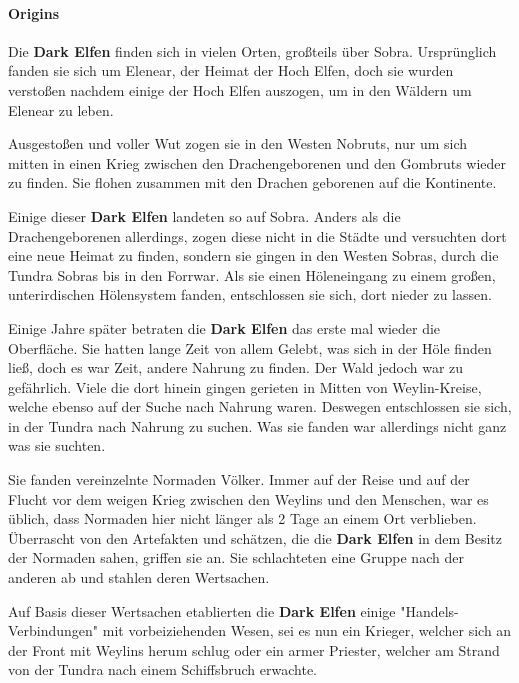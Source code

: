 \paragraph{Origins}

Die \textbf{Dark Elfen} finden sich in vielen Orten, großteils über Sobra. Ursprünglich fanden sie sich um Elenear, der Heimat der Hoch Elfen, doch sie wurden verstoßen nachdem einige der Hoch Elfen auszogen, um in den Wäldern um Elenear zu leben.

Ausgestoßen und voller Wut zogen sie in den Westen Nobruts, nur um sich mitten in einen Krieg zwischen den Drachengeborenen und den Gombruts wieder zu finden. Sie flohen zusammen mit den Drachen geborenen auf die Kontinente.

Einige dieser \textbf{Dark Elfen} landeten so auf Sobra. Anders als die Drachengeborenen allerdings, zogen diese nicht in die Städte und versuchten dort eine neue Heimat zu finden, sondern sie gingen in den Westen Sobras, durch die Tundra Sobras bis in den Forrwar. Als sie einen Höleneingang zu einem großen, unterirdischen Hölensystem fanden, entschlossen sie sich, dort nieder zu lassen.

Einige Jahre später betraten die \textbf{Dark Elfen} das erste mal wieder die Oberfläche. Sie hatten lange Zeit von allem Gelebt, was sich in der Höle finden ließ, doch es war Zeit, andere Nahrung zu finden. Der Wald jedoch war zu gefährlich. Viele die dort hinein gingen gerieten in Mitten von Weylin-Kreise, welche ebenso auf der Suche nach Nahrung waren. Deswegen entschlossen sie sich, in der Tundra nach Nahrung zu suchen. Was sie fanden war allerdings nicht ganz was sie suchten.

Sie fanden vereinzelnte Normaden Völker. Immer auf der Reise und auf der Flucht vor dem weigen Krieg zwischen den Weylins und den Menschen, war es üblich, dass Normaden hier nicht länger als 2 Tage an einem Ort verblieben. Überrascht von den Artefakten und schätzen, die die \textbf{Dark Elfen} in dem Besitz der Normaden sahen, griffen sie an. Sie schlachteten eine Gruppe nach der anderen ab und stahlen deren Wertsachen.

Auf Basis dieser Wertsachen etablierten die \textbf{Dark Elfen} einige "Handels-Verbindungen" mit vorbeiziehenden Wesen, sei es nun ein Krieger, welcher sich an der Front mit Weylins herum schlug oder ein armer Priester, welcher am Strand von der Tundra nach einem Schiffsbruch erwachte.